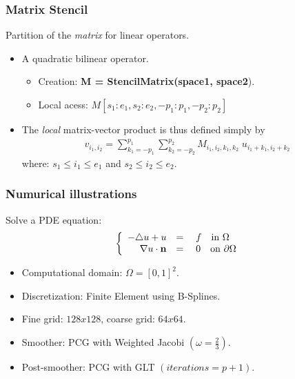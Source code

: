 \begin{frame}
\frametitle{Matrix Stencil}
  Partition of the \emph{matrix} for linear operators.
  \vskip 0.2cm

  \begin{itemize}
  \item A quadratic bilinear operator.
    \begin{itemize}
    \item [\ding{224}] Creation: \textbf{\footnotesize M = StencilMatrix(space1, space2}).
    \item [\ding{224}] Local acess: $M[s_1:e_1, s_2:e_2, -p_1:p_1, -p_2:p_2]$
    \end{itemize}
    \item The \emph{local} matrix-vector product is thus defined simply by
\begin{align*}
    v_{i_1,i_2} = \sum_{k_1=-p_1}^{p_1}\!\sum_{k_2=-p_2}^{p_2}
    M_{i_1,i_2,k_1,k_2}\;u_{i_1+k_1,i_2+k_2}
  \end{align*}
where: $ s_1\le i_1\le e_1$ and $s_2\le i_2\le e_2$.
\end{itemize}
 
\end{frame}



\begin{frame}
\frametitle{Numurical illustrations}
 Solve a PDE equation:
\begin{eqnarray*}
\left\{
\begin{array}{r l}
-\triangle u + u  &= \quad  f \quad \text{in } \Omega
\\
\nabla u \cdot\textbf{n} & = \quad 0 \quad \text{on } \partial \Omega
\\
\end{array}
\right.
\end{eqnarray*}
\begin{itemize}
\item Computational domain: $\Omega = [0,1]^2$.
\item Discretization: Finite Element using B-Splines. 
\item Fine grid: $128x128$, coarse grid: $64x64$.
\item Smoother: PCG with Weighted Jacobi $(\omega = \frac{2}{3})$.
\item Post-smoother: PCG with GLT $(iterations = p+1)$.
\end{itemize}

\end{frame}

